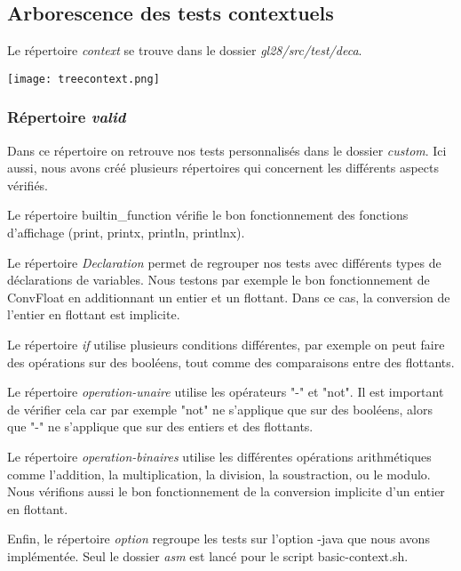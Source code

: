 \documentclass[12pt, a4paper, one side]{article}
\begin{document}
\subsection{Arborescence des tests contextuels}
Le répertoire \textit{context} se trouve dans le dossier \textit{gl28/src/test/deca}.
\begin{center} 
    \texttt{[image: treecontext.png]} 
\end{center}

\subsubsection{Répertoire \textit{valid}}
Dans ce répertoire on retrouve nos tests personnalisés dans le dossier \textit{custom}. Ici aussi, nous avons créé plusieurs répertoires qui concernent les différents aspects vérifiés.

\begin{flushleft}
Le répertoire builtin\_function vérifie le bon fonctionnement des fonctions d'affichage (print, printx, println, printlnx).
\end{flushleft}
\begin{flushleft}
Le répertoire \textit{Declaration} permet de regrouper nos tests avec différents types de déclarations de variables. Nous testons par exemple le bon fonctionnement de ConvFloat en additionnant un entier et un flottant. Dans ce cas, la conversion de l'entier en flottant est implicite.
\end{flushleft}
\begin{flushleft}
Le répertoire \textit{if} utilise plusieurs conditions différentes, par exemple on peut faire des opérations sur des booléens, tout comme des comparaisons entre des flottants.
\end{flushleft}
\begin{flushleft}
Le répertoire \textit{operation-unaire} utilise les opérateurs "-" et "not". Il est important de vérifier cela car par exemple "not" ne s'applique que sur des booléens, alors que "-" ne s'applique que sur des entiers et des flottants.
\end{flushleft}
\begin{flushleft}
Le répertoire \textit{operation-binaires} utilise les différentes opérations arithmétiques comme l'addition, la multiplication, la division, la soustraction, ou le modulo. Nous vérifions aussi le bon fonctionnement de la conversion implicite d'un entier en flottant.
\end{flushleft}
\begin{flushleft}
Enfin, le répertoire \textit{option} regroupe les tests sur l'option -java que nous avons implémentée. Seul le dossier \textit{asm} est lancé pour le script basic-context.sh.
\end{flushleft}
\end{document}
